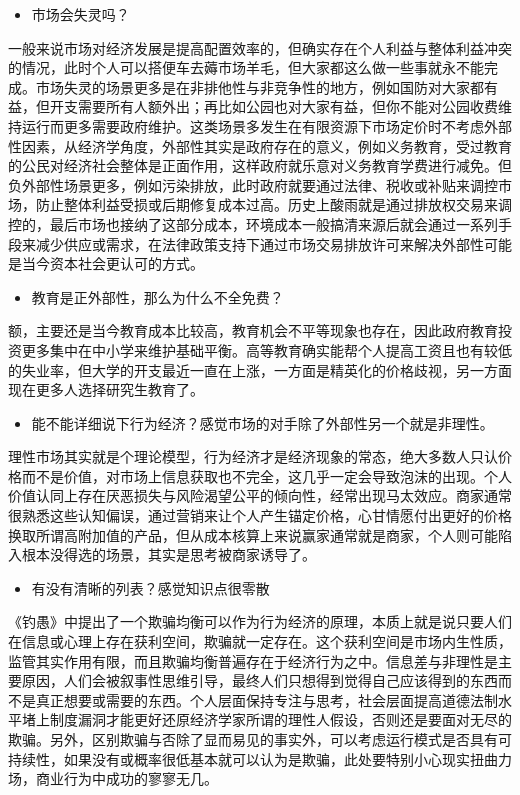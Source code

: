 \documentclass[
  letterpaper,
  DIV=11,
  numbers=noendperiod]{scrreprt}
\providecommand{\tightlist}{%
  \setlength{\itemsep}{0pt}\setlength{\parskip}{0pt}}\usepackage{longtable,booktabs,array}
\begin{document}
\begin{itemize}
\tightlist
\item
  市场会失灵吗？
\end{itemize}

一般来说市场对经济发展是提高配置效率的，但确实存在个人利益与整体利益冲突的情况，此时个人可以搭便车去薅市场羊毛，但大家都这么做一些事就永不能完成。市场失灵的场景更多是在非排他性与非竞争性的地方，例如国防对大家都有益，但开支需要所有人额外出；再比如公园也对大家有益，但你不能对公园收费维持运行而更多需要政府维护。这类场景多发生在有限资源下市场定价时不考虑外部性因素，从经济学角度，外部性其实是政府存在的意义，例如义务教育，受过教育的公民对经济社会整体是正面作用，这样政府就乐意对义务教育学费进行减免。但负外部性场景更多，例如污染排放，此时政府就要通过法律、税收或补贴来调控市场，防止整体利益受损或后期修复成本过高。历史上酸雨就是通过排放权交易来调控的，最后市场也接纳了这部分成本，环境成本一般搞清来源后就会通过一系列手段来减少供应或需求，在法律政策支持下通过市场交易排放许可来解决外部性可能是当今资本社会更认可的方式。

\begin{itemize}
\tightlist
\item
  教育是正外部性，那么为什么不全免费？
\end{itemize}

额，主要还是当今教育成本比较高，教育机会不平等现象也存在，因此政府教育投资更多集中在中小学来维护基础平衡。高等教育确实能帮个人提高工资且也有较低的失业率，但大学的开支最近一直在上涨，一方面是精英化的价格歧视，另一方面现在更多人选择研究生教育了。

\begin{itemize}
\tightlist
\item
  能不能详细说下行为经济？感觉市场的对手除了外部性另一个就是非理性。
\end{itemize}

理性市场其实就是个理论模型，行为经济才是经济现象的常态，绝大多数人只认价格而不是价值，对市场上信息获取也不完全，这几乎一定会导致泡沫的出现。个人价值认同上存在厌恶损失与风险渴望公平的倾向性，经常出现马太效应。商家通常很熟悉这些认知偏误，通过营销来让个人产生锚定价格，心甘情愿付出更好的价格换取所谓高附加值的产品，但从成本核算上来说赢家通常就是商家，个人则可能陷入根本没得选的场景，其实是思考被商家诱导了。

\begin{itemize}
\tightlist
\item
  有没有清晰的列表？感觉知识点很零散
\end{itemize}

《钓愚》中提出了一个欺骗均衡可以作为行为经济的原理，本质上就是说只要人们在信息或心理上存在获利空间，欺骗就一定存在。这个获利空间是市场内生性质，监管其实作用有限，而且欺骗均衡普遍存在于经济行为之中。信息差与非理性是主要原因，人们会被叙事性思维引导，最终人们只想得到觉得自己应该得到的东西而不是真正想要或需要的东西。个人层面保持专注与思考，社会层面提高道德法制水平堵上制度漏洞才能更好还原经济学家所谓的理性人假设，否则还是要面对无尽的欺骗。另外，区别欺骗与否除了显而易见的事实外，可以考虑运行模式是否具有可持续性，如果没有或概率很低基本就可以认为是欺骗，此处要特别小心现实扭曲力场，商业行为中成功的寥寥无几。
\end{document}
